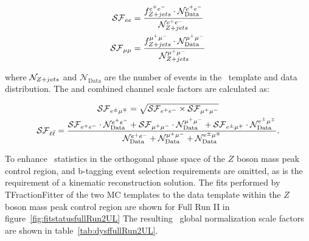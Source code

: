 \begin{linenomath*}
\begin{align}
\mathcal{SF}_{ee} &= \frac{f_{Z+jets}^{e^{+}e^{-}} \cdot \mathcal{N}_\text{Data}^{e^{+}e^{-}}}{\mathcal{N}_{Z+jets}^{e^{+}e^{-}}} \\
\mathcal{SF}_{\mu\mu} &= \frac{f_{Z+jets}^{\mu^{+}\mu^{-}} \cdot \mathcal{N}_\text{Data}^{\mu^{+}\mu^{-}}}{\mathcal{N}_{Z+jets}^{\mu^{+}\mu^{-}}}
\end{align}
\end{linenomath*}
where $\mathcal{N}_{Z+jets}$ and $\mathcal{N}_\text{Data}$ are the number of events in the \zjets\ template and data distribution.
The \emu and combined channel scale factors are calculated as:
\begin{linenomath*}
\begin{gather}
\mathcal{SF}_{e^{\pm}\mu^{\mp}} = \sqrt{\mathcal{SF}_{e^{+}e^{-}} \times \mathcal{SF}_{\mu^{+}\mu^{-}}} \\
\mathcal{SF}_{\ell \bar{\ell}} = \frac{\mathcal{SF}_{e^{+}e^{-}} \cdot \mathcal{N}_\text{Data}^{e^{+}e^{-}} + \mathcal{SF}_{\mu^{+}\mu^{-}} \cdot \mathcal{N}_\text{Data}^{\mu^{+}\mu^{-}} + \mathcal{SF}_{e^{\pm}\mu^{\mp}} \cdot \mathcal{N}_\text{Data}^{e^{\pm}\mu^{\mp}}}{\mathcal{N}_\text{Data}^{e^{+}e^{-}} + \mathcal{N}_\text{Data}^{\mu^{+}\mu^{-}} + \mathcal{N}_\text{Data}^{e^{\pm}\mu^{\mp}}}.
\end{gather}
\end{linenomath*}
To enhance \zjets\ statistics in the orthogonal phase space of the $Z$ boson mass peak control region, \MET and b-tagging event selection requirements are omitted, as is the requirement of a kinematic reconstruction solution.
The fits performed by TFractionFitter of the two MC templates to the data template within the $Z$ boson mass peak control region are shown for Full Run II in figure~\ref{fig:fitstatusfullRun2UL}
The resulting \zjets\ global normalization scale factors are shown in table~\ref{tab:dysffullRun2UL}.

